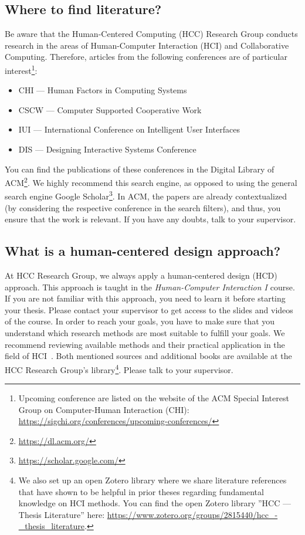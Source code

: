\subsection*{Where to find literature?}
Be aware that the Human-Centered Computing (HCC) Research Group conducts research in the areas of Human-Computer Interaction (HCI) and Collaborative Computing. Therefore, articles from the following conferences are of particular interest\footnote{Upcoming conference are listed on the website of the ACM Special Interest Group on Computer-Human Interaction (CHI): \url{https://sigchi.org/conferences/upcoming-conferences/}}: 

\begin{itemize}
    \itemsep0em %
    \item CHI --- Human Factors in Computing Systems
    \item CSCW --- Computer Supported Cooperative Work
    \item IUI --- International Conference on Intelligent User Interfaces
    \item DIS --- Designing Interactive Systems Conference
\end{itemize}

You can find the publications of these conferences in the Digital Library of ACM\footnote{ \url{https://dl.acm.org/}}. We highly recommend this search engine, as opposed to using the general search engine Google Scholar\footnote{\url{https://scholar.google.com/}}. In ACM, the papers are already contextualized (by considering the respective conference in the search filters), and thus, you ensure that the work is relevant. If you have any doubts, talk to your supervisor.

\subsection*{What is a human-centered design approach?}
At HCC Research Group, we always apply a human-centered design (HCD) approach. This approach is taught in the \emph{Human-Computer Interaction I} course. If you are not familiar with this approach, you need to learn it before starting your thesis. Please contact your supervisor to get access to the slides and videos of the course. In order to reach your goals, you have to make sure that you understand which research methods are most suitable to fulfill your goals. We recommend reviewing available methods and their practical application in the field of HCI~\cite{lazar2017research, olson2014ways}. Both mentioned sources and additional books are available at the HCC Research Group's library\footnote{We also set up an open Zotero library where we share literature references that have shown to be helpful in prior theses regarding fundamental knowledge on HCI methods. You can find the open Zotero library ''HCC --- Thesis Literature'' here: \url{https://www.zotero.org/groups/2815440/hcc_-_thesis_literature}.}. Please talk to your supervisor.


\afterpage{\nopagecolor}